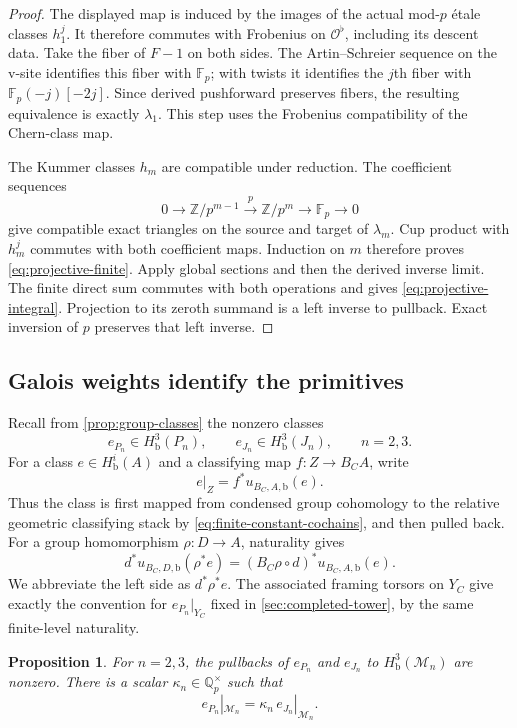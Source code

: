 \documentclass[11pt]{article}
\numberwithin{equation}{section}
\newtheorem{proposition}[theorem]{Proposition}
\theoremstyle{definition}
\theoremstyle{remark}
\newcommand{\Q}{\mathbb Q}
\newcommand{\Z}{\mathbb Z}
\newcommand{\F}{\mathbb F}
\newcommand{\cO}{\mathcal O}
\begin{document}
\begin{proof}
The displayed map is induced by the images of the actual mod-$p$
\'etale classes $h_1^j$.  It therefore commutes with Frobenius on
$\cO^\flat$, including its descent data.  Take the fiber of
$F-1$ on both sides.  The Artin--Schreier sequence on the v-site
identifies this fiber with $\F_p$; with twists it identifies the
$j$th fiber with $\F_p(-j)[-2j]$.
Since derived pushforward preserves fibers, the resulting equivalence
is exactly $\lambda_1$.
This step uses the Frobenius compatibility of the Chern-class map.

The Kummer classes $h_m$ are compatible under reduction.
The coefficient sequences
\[
 0\longrightarrow\Z/p^{m-1}\xrightarrow{\,p\,}\Z/p^m
       \longrightarrow\F_p\longrightarrow0
\]
give compatible exact triangles on the source and target of
$\lambda_m$.  Cup product with $h_m^j$ commutes with both coefficient
maps.  Induction on $m$ therefore proves
\cref{eq:projective-finite}.
Apply global sections and then the derived inverse limit.
The finite direct sum commutes with both operations and gives
\cref{eq:projective-integral}.  Projection to its zeroth summand
is a left inverse to pullback.  Exact inversion of $p$ preserves that
left inverse.
\end{proof}

\subsection{Galois weights identify the primitives}

Recall from \cref{prop:group-classes} the nonzero classes
\[
 e_{P_n}\in H^3_{\mathrm b}(P_n),\qquad
 e_{J_n}\in H^3_{\mathrm b}(J_n),\qquad n=2,3.
\]
For a class $e\in H^i_{\mathrm b}(A)$ and a classifying map
$f:Z\to B_CA$, write
\[
 e|_Z=f^*u_{B_C,A,\mathrm b}(e).
\]
Thus the class is first mapped from condensed group cohomology to the
relative geometric classifying stack by
\eqref{eq:finite-constant-cochains}, and then pulled back.  For a group
homomorphism $\rho:D\to A$, naturality gives
\[
 d^*u_{B_C,D,\mathrm b}(\rho^*e)
       =(B_C\rho\circ d)^*u_{B_C,A,\mathrm b}(e).
\]
We abbreviate the left side as $d^*\rho^*e$.  The associated framing
torsors on $Y_C$ give exactly the convention for $e_{P_n}|_{Y_C}$
fixed in \cref{sec:completed-tower}, by the same finite-level naturality.

\begin{proposition}\label{prop:primitive-comparison}
For $n=2,3$, the pullbacks of $e_{P_n}$ and $e_{J_n}$ to
$H^3_{\mathrm b}(\mathcal M_n)$ are nonzero.
There is a scalar $\kappa_n\in\Q_p^\times$ such that
\begin{equation}\label{eq:primitive-comparison}
 e_{P_n}|_{\mathcal M_n}
        =\kappa_n\,e_{J_n}|_{\mathcal M_n}.
\end{equation}
\end{proposition}
\end{document}
